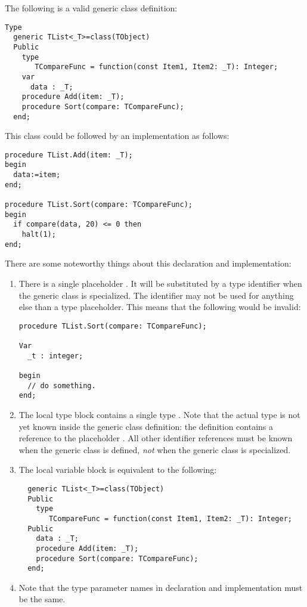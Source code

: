 The following is a valid generic class definition:
\begin{verbatim}
Type
  generic TList<_T>=class(TObject)
  Public
    type
       TCompareFunc = function(const Item1, Item2: _T): Integer;
    var
      data : _T;
    procedure Add(item: _T);
    procedure Sort(compare: TCompareFunc);
  end;
\end{verbatim}
This class could be followed by an implementation as follows:
\begin{verbatim}
procedure TList.Add(item: _T);
begin
  data:=item;
end;

procedure TList.Sort(compare: TCompareFunc);
begin
  if compare(data, 20) <= 0 then
    halt(1);
end;
\end{verbatim}
There are some noteworthy things about this declaration and implementation:
\begin{enumerate}
\item There is a single placeholder . It will be substituted by a
type identifier when the generic class is specialized. The identifier
 may not be used for anything else than a type placeholder.
This means that the following would be invalid:
\begin{verbatim}
procedure TList.Sort(compare: TCompareFunc);

Var
  _t : integer;

begin
  // do something.
end;
\end{verbatim}
\item The local type block contains a single type . Note
that the actual type is not yet known inside the generic class definition:
the definition contains a reference to the placeholder . All other
identifier references must be known when the generic class is defined, {\em not}
when the generic class is specialized.
\item The local variable block is equivalent to the following:
\begin{verbatim}
  generic TList<_T>=class(TObject)
  Public
    type
       TCompareFunc = function(const Item1, Item2: _T): Integer;
  Public
    data : _T;
    procedure Add(item: _T);
    procedure Sort(compare: TCompareFunc);
  end;
\end{verbatim}
\item Note that the type parameter names in declaration and implementation must be the
same.
\end{enumerate}

